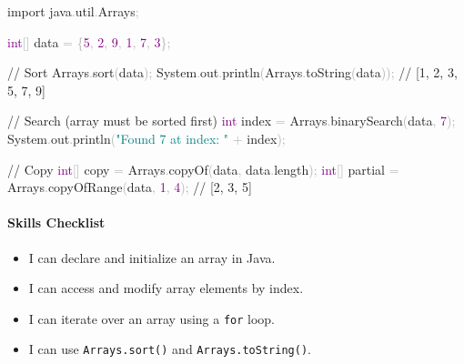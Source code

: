 \documentclass[
  justified,
  openright,
]{tufte-book}
\let\subsubsection\paragraph
\let\paragraph\paragraph
\newcommand{\BuiltInTok}[1]{#1}
\newcommand{\CommentTok}[1]{\textcolor{MidGray}{#1}}
\newcommand{\DataTypeTok}[1]{\textcolor{Purple}{#1}}
\newcommand{\DecValTok}[1]{\textcolor{Purple}{#1}}
\newcommand{\FunctionTok}[1]{\textcolor{BrandBlue}{#1}}
\newcommand{\ImportTok}[1]{\textcolor{BrandAccent}{#1}}
\newcommand{\KeywordTok}[1]{\textcolor{BrandBlue}{#1}}
\newcommand{\NormalTok}[1]{#1}
\newcommand{\OperatorTok}[1]{\textcolor{DarkGray}{#1}}
\newcommand{\StringTok}[1]{\textcolor{Teal}{#1}}
\newenvironment{Shaded}{%
  \begin{snugshade}
}{%
  \end{snugshade}
}
\let\subsubsection\paragraph
\let\paragraph\paragraph
\providecommand{\tightlist}{%
  \setlength{\itemsep}{0pt}\setlength{\parskip}{0pt}}
\begin{document}
\begin{Shaded}
\begin{Highlighting}[]
\KeywordTok{import} \ImportTok{java}\OperatorTok{.}\ImportTok{util}\OperatorTok{.}\ImportTok{Arrays}\OperatorTok{;}

\DataTypeTok{int}\OperatorTok{[]}\NormalTok{ data }\OperatorTok{=} \OperatorTok{\{}\DecValTok{5}\OperatorTok{,} \DecValTok{2}\OperatorTok{,} \DecValTok{9}\OperatorTok{,} \DecValTok{1}\OperatorTok{,} \DecValTok{7}\OperatorTok{,} \DecValTok{3}\OperatorTok{\};}

\CommentTok{// Sort}
\BuiltInTok{Arrays}\OperatorTok{.}\FunctionTok{sort}\OperatorTok{(}\NormalTok{data}\OperatorTok{);}
\BuiltInTok{System}\OperatorTok{.}\FunctionTok{out}\OperatorTok{.}\FunctionTok{println}\OperatorTok{(}\BuiltInTok{Arrays}\OperatorTok{.}\FunctionTok{toString}\OperatorTok{(}\NormalTok{data}\OperatorTok{));}   \CommentTok{// [1, 2, 3, 5, 7, 9]}

\CommentTok{// Search (array must be sorted first)}
\DataTypeTok{int}\NormalTok{ index }\OperatorTok{=} \BuiltInTok{Arrays}\OperatorTok{.}\FunctionTok{binarySearch}\OperatorTok{(}\NormalTok{data}\OperatorTok{,} \DecValTok{7}\OperatorTok{);}
\BuiltInTok{System}\OperatorTok{.}\FunctionTok{out}\OperatorTok{.}\FunctionTok{println}\OperatorTok{(}\StringTok{"Found 7 at index: "} \OperatorTok{+}\NormalTok{ index}\OperatorTok{);}

\CommentTok{// Copy}
\DataTypeTok{int}\OperatorTok{[]}\NormalTok{ copy }\OperatorTok{=} \BuiltInTok{Arrays}\OperatorTok{.}\FunctionTok{copyOf}\OperatorTok{(}\NormalTok{data}\OperatorTok{,}\NormalTok{ data}\OperatorTok{.}\FunctionTok{length}\OperatorTok{);}
\DataTypeTok{int}\OperatorTok{[]}\NormalTok{ partial }\OperatorTok{=} \BuiltInTok{Arrays}\OperatorTok{.}\FunctionTok{copyOfRange}\OperatorTok{(}\NormalTok{data}\OperatorTok{,} \DecValTok{1}\OperatorTok{,} \DecValTok{4}\OperatorTok{);}  \CommentTok{// [2, 3, 5]}
\end{Highlighting}
\end{Shaded}

\subsubsection{Skills Checklist}\label{skills-checklist-10}

\begin{itemize}
\tightlist
\item[$\square$]
  I can declare and initialize an array in Java.
\item[$\square$]
  I can access and modify array elements by index.
\item[$\square$]
  I can iterate over an array using a \texttt{for} loop.
\item[$\square$]
  I can use \texttt{Arrays.sort()} and \texttt{Arrays.toString()}.
\end{itemize}
\end{document}
